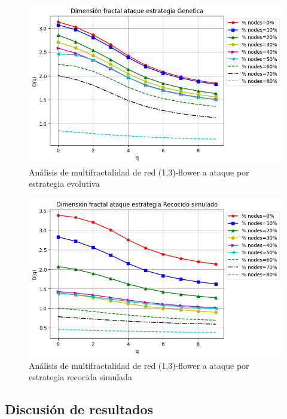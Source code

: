 \begin{figure}[H]
    \centering
    \includegraphics[scale=0.7]{Capitulo6MultifractalidadYRobustez/imagenes/grafica_DqGenetic20180501_151350floweru1v3.png}
    \caption{Análisis de multifractalidad de red (1,3)-flower a ataque por estrategia evolutiva }
\end{figure}

\begin{figure}[H]
    \centering
    \includegraphics[scale=0.7]{Capitulo6MultifractalidadYRobustez/imagenes/grafica_DqSimulated20180501_151350floweru1v3.png}
    \caption{Análisis de multifractalidad de red (1,3)-flower a ataque por estrategia recocida simulada }
\end{figure}

\subsection{Discusión de resultados}

